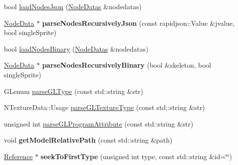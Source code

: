 \begin{DoxyCompactItemize}
\item 
bool \hyperlink{classBundle3D_a3e4b6166d71360d79c4e043f780f6960}{load\+Nodes\+Json} (\hyperlink{structNodeDatas}{Node\+Datas} \&nodedatas)
\item 
\mbox{\label{classBundle3D_a012d6049b826180bb6f38c32cfff44ef}} 
\hyperlink{structNodeData}{Node\+Data} $\ast$ {\bfseries parse\+Nodes\+Recursively\+Json} (const rapidjson\+::\+Value \&jvalue, bool single\+Sprite)
\item 
bool \hyperlink{classBundle3D_a83744280068184dce4d36dc6260e69b8}{load\+Nodes\+Binary} (\hyperlink{structNodeDatas}{Node\+Datas} \&nodedatas)
\item 
\mbox{\label{classBundle3D_a0a10a22f8a2dff21849330e3a2be9eaf}} 
\hyperlink{structNodeData}{Node\+Data} $\ast$ {\bfseries parse\+Nodes\+Recursively\+Binary} (bool \&skeleton, bool single\+Sprite)
\item 
G\+Lenum \hyperlink{classBundle3D_ada1b94dfaf386bba7c8014a2678da5fb}{parse\+G\+L\+Type} (const std\+::string \&str)
\item 
N\+Texture\+Data\+::\+Usage \hyperlink{classBundle3D_a467d6b0c572920193acd43365a7300d2}{parse\+G\+L\+Texture\+Type} (const std\+::string \&str)
\item 
unsigned int \hyperlink{classBundle3D_a0a7ca57fdb38995fa753d07beffb7501}{parse\+G\+L\+Program\+Attribute} (const std\+::string \&str)
\item 
\mbox{\label{classBundle3D_a767d59fd16f4c7d0e0c7b7d3350ae12e}} 
void {\bfseries get\+Model\+Relative\+Path} (const std\+::string \&path)
\item 
\mbox{\label{classBundle3D_a1bc55cb390b4057e3e0ecb265dcfe272}} 
\hyperlink{structReference}{Reference} $\ast$ {\bfseries seek\+To\+First\+Type} (unsigned int type, const std\+::string \&id=\char`\"{}\char`\"{})
\end{DoxyCompactItemize}
